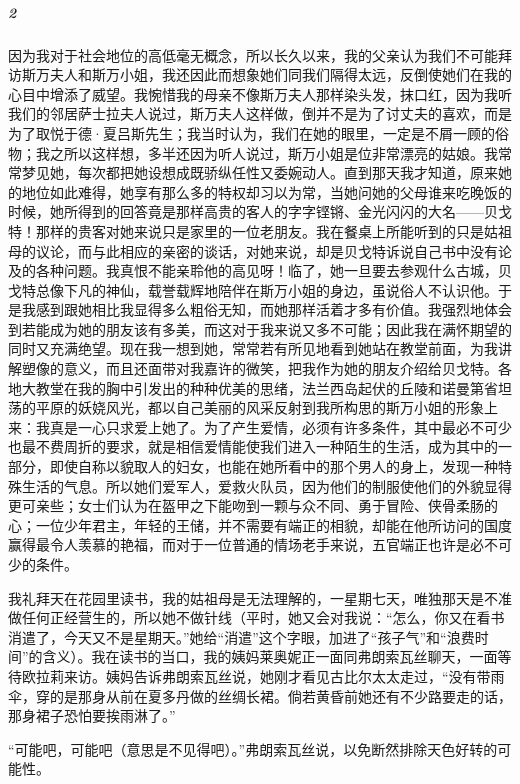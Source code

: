 \subparagraph*{2}

\par 因为我对于社会地位的高低毫无概念，所以长久以来，我的父亲认为我们不可能拜访斯万夫人和斯万小姐，我还因此而想象她们同我们隔得太远，反倒使她们在我的心目中增添了威望。我惋惜我的母亲不像斯万夫人那样染头发，抹口红，因为我听我们的邻居萨士拉夫人说过，斯万夫人这样做，倒并不是为了讨丈夫的喜欢，而是为了取悦于德·夏吕斯先生；我当时认为，我们在她的眼里，一定是不屑一顾的俗物；我之所以这样想，多半还因为听人说过，斯万小姐是位非常漂亮的姑娘。我常常梦见她，每次都把她设想成既骄纵任性又委婉动人。直到那天我才知道，原来她的地位如此难得，她享有那么多的特权却习以为常，当她问她的父母谁来吃晚饭的时候，她所得到的回答竟是那样高贵的客人的字字铿锵、金光闪闪的大名——贝戈特！那样的贵客对她来说只是家里的一位老朋友。我在餐桌上所能听到的只是姑祖母的议论，而与此相应的亲密的谈话，对她来说，却是贝戈特诉说自己书中没有论及的各种问题。我真恨不能亲聆他的高见呀！临了，她一旦要去参观什么古城，贝戈特总像下凡的神仙，载誉载辉地陪伴在斯万小姐的身边，虽说俗人不认识他。于是我感到跟她相比我显得多么粗俗无知，而她那样活着才多有价值。我强烈地体会到若能成为她的朋友该有多美，而这对于我来说又多不可能；因此我在满怀期望的同时又充满绝望。现在我一想到她，常常若有所见地看到她站在教堂前面，为我讲解塑像的意义，而且还面带对我嘉许的微笑，把我作为她的朋友介绍给贝戈特。各地大教堂在我的胸中引发出的种种优美的思绪，法兰西岛起伏的丘陵和诺曼第省坦荡的平原的妖娆风光，都以自己美丽的风采反射到我所构思的斯万小姐的形象上来：我真是一心只求爱上她了。为了产生爱情，必须有许多条件，其中最必不可少也最不费周折的要求，就是相信爱情能使我们进入一种陌生的生活，成为其中的一部分，即使自称以貌取人的妇女，也能在她所看中的那个男人的身上，发现一种特殊生活的气息。所以她们爱军人，爱救火队员，因为他们的制服使他们的外貌显得更可亲些；女士们认为在盔甲之下能吻到一颗与众不同、勇于冒险、侠骨柔肠的心；一位少年君主，年轻的王储，并不需要有端正的相貌，却能在他所访问的国度赢得最令人羡慕的艳福，而对于一位普通的情场老手来说，五官端正也许是必不可少的条件。
\par 我礼拜天在花园里读书，我的姑祖母是无法理解的，一星期七天，唯独那天是不准做任何正经营生的，所以她不做针线（平时，她又会对我说：“怎么，你又在看书消遣了，今天又不是星期天。”她给“消遣”这个字眼，加进了“孩子气”和“浪费时间”的含义）。我在读书的当口，我的姨妈莱奥妮正一面同弗朗索瓦丝聊天，一面等待欧拉莉来访。姨妈告诉弗朗索瓦丝说，她刚才看见古比尔太太走过，“没有带雨伞，穿的是那身从前在夏多丹做的丝绸长裙。倘若黄昏前她还有不少路要走的话，那身裙子恐怕要挨雨淋了。”
\par “可能吧，可能吧（意思是不见得吧）。”弗朗索瓦丝说，以免断然排除天色好转的可能性。
